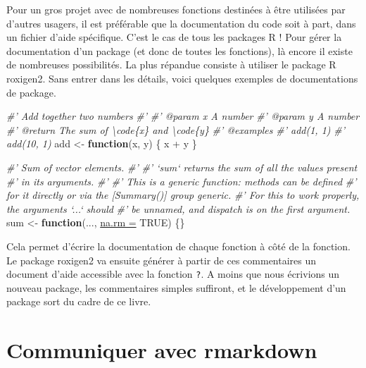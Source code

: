 \documentclass[twoside,symmetric]{book}
\newenvironment{Shaded}{}{}
\newcommand{\CommentTok}[1]{\textit{#1}}
\newcommand{\ControlFlowTok}[1]{\textbf{#1}}
\newcommand{\DataTypeTok}[1]{\underline{#1}}
\newcommand{\NormalTok}[1]{#1}
\newcommand{\OperatorTok}[1]{#1}
\newcommand{\OtherTok}[1]{#1}
\newcommand{\StringTok}[1]{#1}
\begin{document}
Pour un gros projet avec de nombreuses fonctions destinées à être utilisées par d'autres usagers, il est préférable que la documentation du code soit à part, dans un fichier d'aide spécifique. C'est le cas de tous les packages R ! Pour gérer la documentation d'un package (et donc de toutes les fonctions), là encore il existe de nombreuses possibilités. La plus répandue consiste à utiliser le package R roxigen2. Sans entrer dans les détails, voici quelques exemples de documentations de package.

\begin{Shaded}
\begin{Highlighting}[]
\CommentTok{#' Add together two numbers}
\CommentTok{#'}
\CommentTok{#' @param x A number}
\CommentTok{#' @param y A number}
\CommentTok{#' @return The sum of \textbackslash{}code\{x\} and \textbackslash{}code\{y\}}
\CommentTok{#' @examples}
\CommentTok{#' add(1, 1)}
\CommentTok{#' add(10, 1)}
\NormalTok{add <-}\StringTok{ }\ControlFlowTok{function}\NormalTok{(x, y) \{}
\NormalTok{  x }\OperatorTok{+}\StringTok{ }\NormalTok{y}
\NormalTok{\}}
\end{Highlighting}
\end{Shaded}

\begin{Shaded}
\begin{Highlighting}[]
\CommentTok{#' Sum of vector elements.}
\CommentTok{#'}
\CommentTok{#' `sum` returns the sum of all the values present }
\CommentTok{#' in its arguments.}
\CommentTok{#'}
\CommentTok{#' This is a generic function: methods can be defined }
\CommentTok{#' for it directly or via the [Summary()] group generic. }
\CommentTok{#' For this to work properly, the arguments `...` should }
\CommentTok{#' be unnamed, and dispatch is on the first argument.}
\NormalTok{sum <-}\StringTok{ }\ControlFlowTok{function}\NormalTok{(..., }\DataTypeTok{na.rm =} \OtherTok{TRUE}\NormalTok{) \{\}}
\end{Highlighting}
\end{Shaded}

Cela permet d'écrire la documentation de chaque fonction à côté de la fonction. Le package roxigen2 va ensuite générer à partir de ces commentaires un document d'aide accessible avec la fonction \texttt{\textquotesingle{}?\textquotesingle{}}. A moins que nous écrivions un nouveau package, les commentaires simples suffiront, et le développement d'un package sort du cadre de ce livre.

\hypertarget{communiquer-avec-rmarkdown}{%
\section{Communiquer avec rmarkdown}\label{communiquer-avec-rmarkdown}}
\end{document}
